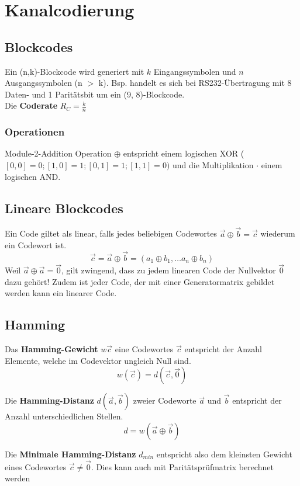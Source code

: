 \section{Kanalcodierung}
\subsection{Blockcodes}
Ein (n,k)-Blockcode wird generiert mit $k$ Eingangssymbolen und $n$ Ausgangssymbolen (n $\gt$ k). Bsp. handelt es sich bei RS232-Übertragung mit 8 Daten- und 1 Paritätsbit um ein (9, 8)-Blockcode.~\\

\noindent Die \textbf{Coderate} $R_C = \frac{k}{n}$~\\

\subsubsection{Operationen}
Module-2-Addition Operation $\oplus$ entspricht einem logischen XOR ($[0,0] = 0; [1,0] = 1; [0,1] = 1; [1,1] = 0)$ und die Multiplikation $\cdot$ einem logischen AND.

\subsection{Lineare Blockcodes}
Ein Code giltet als linear, falls jedes beliebigen Codewortes $\vec{a} \oplus \vec{b} = \vec{c}$ wiederum ein Codewort ist. 
\[
\vec{c} = \vec{a}\oplus\vec{b} = \left(a_1 \oplus b_1, \dots a_n \oplus b_n\right)
\]
Weil $\vec{a}\oplus\vec{a} = \vec{0}$, gilt zwingend, dass zu jedem linearen Code der Nullvektor $\vec{0}$ dazu gehört! Zudem ist jeder Code, der mit einer Generatormatrix gebildet werden kann ein linearer Code.

\subsection{Hamming}
\noindent Das \textbf{Hamming-Gewicht} $w\vec{c}$ eine Codewortes $\vec{c}$ entspricht der Anzahl Elemente, welche im Codevektor ungleich Null sind. \[w(\vec{c}) = d(\vec{c}, \vec{0})\]

\noindent Die \textbf{Hamming-Distanz} $d(\vec{a}, \vec{b})$ zweier Codeworte $\vec{a}$ und $\vec{b}$ entspricht der Anzahl unterschiedlichen Stellen. \[d = w(\vec{a} \oplus \vec{b})\]

\noindent Die \textbf{Minimale Hamming-Distanz} $d_{min}$ entspricht also dem kleinsten Gewicht eines Codewortes $\vec{c} \neq \vec{0}$. Dies kann auch mit Paritätsprüfmatrix berechnet werden~\\

